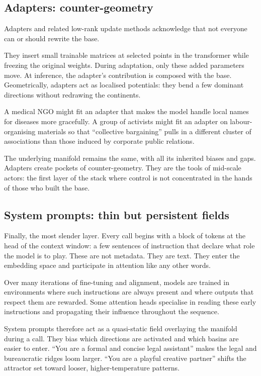 \subsection{Adapters: counter-geometry}

Adapters and related low-rank update methods acknowledge that not everyone can or should rewrite the base.

They insert small trainable matrices at selected points in the transformer while freezing the original weights. During adaptation, only these added parameters move. At inference, the adapter's contribution is composed with the base. Geometrically, adapters act as localised potentials: they bend a few dominant directions without redrawing the continents.

A medical NGO might fit an adapter that makes the model handle local names for diseases more gracefully. A group of activists might fit an adapter on labour-organising materials so that ``collective bargaining'' pulls in a different cluster of associations than those induced by corporate public relations.

The underlying manifold remains the same, with all its inherited biases and gaps. Adapters create pockets of counter-geometry. They are the tools of mid-scale actors: the first layer of the stack where control is not concentrated in the hands of those who built the base.

\subsection{System prompts: thin but persistent fields}

Finally, the most slender layer. Every call begins with a block of tokens at the head of the context window: a few sentences of instruction that declare what role the model is to play. These are not metadata. They are text. They enter the embedding space and participate in attention like any other words.

Over many iterations of fine-tuning and alignment, models are trained in environments where such instructions are always present and where outputs that respect them are rewarded. Some attention heads specialise in reading these early instructions and propagating their influence throughout the sequence.

System prompts therefore act as a quasi-static field overlaying the manifold during a call. They bias which directions are activated and which basins are easier to enter. ``You are a formal and concise legal assistant'' makes the legal and bureaucratic ridges loom larger. ``You are a playful creative partner'' shifts the attractor set toward looser, higher-temperature patterns.

